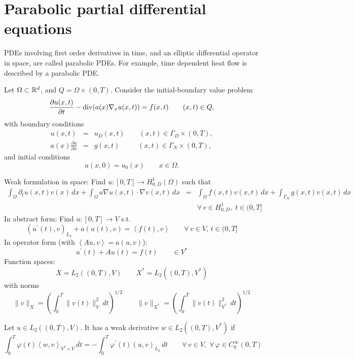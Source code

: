 \chapter{Parabolic partial differential equations}

PDEs involving first order derivatives in time, and an elliptic differential operator
in space, are called parabolic PDEs. For example, time dependent heat flow is described
by a parabolic PDE.

Let $\Omega \subset {\mathbb R}^d$, and $Q = \Omega \times (0,T)$. Consider the initial-boundary
value problem
$$
\frac{\partial u(x,t)}{\partial t} - \operatorname{div} (a(x) \nabla_x u(x,t)) = f(x,t)  \qquad (x,t) \in Q,
$$
with boundary conditions
\begin{eqnarray*}
u(x,t) & = & u_D (x,t) \qquad (x,t) \in \Gamma_D \times (0,T), \\
a(x) \frac{\partial u}{\partial n} & = & g(x,t) \; \; \qquad (x,t) \in \Gamma_N \times (0,T),
\end{eqnarray*}
and initial conditions
$$
u(x,0) = u_0(x) \qquad x \in \Omega.
$$

\bigskip

Weak formulation in space: Find $u : [0,T] \rightarrow H_{0,D}^1(\Omega)$ such that
\begin{eqnarray*}
\int_\Omega \partial_t u (x,t) v(x) \, dx + 
\int_\Omega a \nabla u(x,t) \cdot \nabla v(x,t) \, dx & = &
\int_\Omega f(x,t) v(x,t) \, dx + \int_{\Gamma_N} g(x,t) v(x,t) \, dx \\[1em]
& &  \forall \, v \in H_{0,D}^1, \; t \in (0,T]
\end{eqnarray*}
In abstract form: Find $u : [0,T] \rightarrow V$ s.t.
$$
(u^\prime(t), v)_{L_2} + a(u(t), v) = \left< f(t), v \right> \qquad \forall \, v \in V, \, t \in (0,T]
$$
In operator form (with $\left<A u,v\right> = a(u,v)$):
$$
u^\prime (t) + A u(t) = f(t)  \qquad \in V^\ast
$$
\bigskip
Function spaces:
$$
X = L_2( (0,T), V) \qquad X^\ast = L_2((0,T), V^\ast)
$$
with norms
$$
\| v  \|_X = \left( \int_0^T \| v(t) \|_V^2 \, dt \right)^{1/2}
\qquad
\| v  \|_{X^\ast} = \left( \int_0^T \| v(t) \|_{V^\ast}^2 \, dt \right)^{1/2}
$$

\begin{definition} Let $u \in L_2( (0,T), V)$. It has a weak derivative 
$w \in L_2((0,T),V^\ast)$ if
$$
\int_0^T \varphi(t) \left< w, v \right>_{V^\ast \times V} \, dt = -\int_0^T \varphi^\prime (t) (u,v)_{L_2} \, dt 
\qquad \forall \, v \in V, \; \forall \, \varphi \in C_0^\infty (0,T)
$$
\end{definition}

